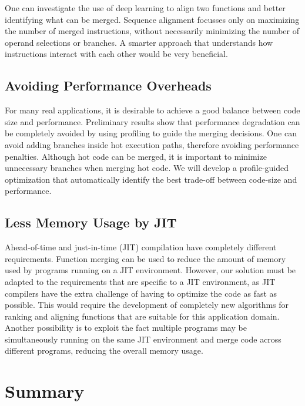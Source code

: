 One can investigate the use of deep learning to align two functions and better identifying what can be merged.
Sequence alignment focusses only on maximizing the number of merged instructions,
without necessarily minimizing the number of operand selections or branches.
A smarter approach that understands how instructions interact with each other would be
very beneficial.


\subsection{Avoiding Performance Overheads}

For many real applications, it is desirable to achieve a good balance between code size and performance.
Preliminary results show that performance degradation can be completely avoided by using profiling to
guide the merging decisions.
One can avoid adding branches inside hot execution paths, therefore avoiding performance penalties.
Although hot code can be merged, it is important to minimize unnecessary branches when merging hot code.
We will develop a profile-guided optimization that automatically identify the best trade-off between code-size and performance.

\subsection{Less Memory Usage by JIT}

Ahead-of-time and just-in-time (JIT) compilation have completely different requirements.
Function merging can be used to reduce the amount of memory used by programs running on a JIT environment.
However, our solution must be adapted to the requirements that are specific to a JIT environment, as JIT compilers have the extra challenge of having to optimize the code as fast as possible.
This would require the development of completely new algorithms for ranking and aligning functions that are suitable for this application domain.
Another possibility is to exploit the fact multiple programs may be simultaneously running on the same JIT environment and merge code across different programs, reducing the overall memory usage.

\section{Summary} \label{sec:conclusion:summary}